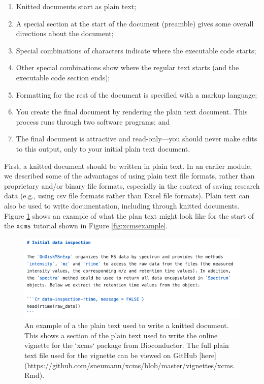 \documentclass[]{tufte-book}
\providecommand{\tightlist}{%
  \setlength{\itemsep}{0pt}\setlength{\parskip}{0pt}}
\begin{document}
\begin{enumerate}
\def\labelenumi{\arabic{enumi}.}
\tightlist
\item
  Knitted documents start as plain text;
\item
  A special section at the start of the document (preamble) gives some
  overall directions about the document;
\item
  Special combinations of characters indicate where the executable code starts;
\item
  Other special combinations show where the regular text starts (and the
  executable code section ends);
\item
  Formatting for the rest of the document is specified with a markup
  language;
\item
  You create the final document by rendering the plain text document. This
  process runs through two software programs; and
\item
  The final document is attractive and read-only---you should never make
  edits to this output, only to your initial plain text document.
\end{enumerate}

First, a knitted document should be written in plain text. In an earlier module,
we described some of the advantages of using plain text file formats, rather
than proprietary and/or binary file formats, especially in the context of saving
research data (e.g., using csv file formats rather than Excel file formats).
Plain text can also be used to write documentation, including through knitted
documents. Figure \ref{fig:xcmsexampleplain} shows an example of what the plan text might look like for the
start of the \texttt{xcms} tutorial shown in Figure \ref{fig:xcmsexample}.

\begin{figure}
\includegraphics[width=\textwidth]{figures/plaintext_vignette_example} \caption[An example of a the plain text used to write a knitted document]{An example of a the plain text used to write a knitted document. This shows a section of the plain text used to write the online vignette for the `xcms` package from Bioconductor. The full plain text file used for the vignette can be viewed on GitHub [here](https://github.com/sneumann/xcms/blob/master/vignettes/xcms.Rmd).}\label{fig:xcmsexampleplain}
\end{figure}
\end{document}
